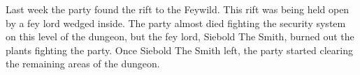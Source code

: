Last week the party found the rift to the Feywild.
This rift was being held open by a fey lord wedged inside.
The party almost died fighting the security system on this level of the dungeon, but the fey lord, Siebold The Smith, burned out the plants fighting the party.
Once Siebold The Smith left, the party started clearing the remaining areas of the dungeon.
